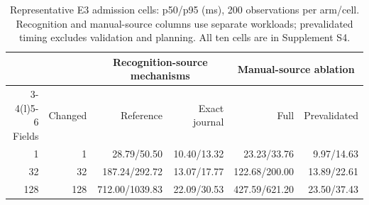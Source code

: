 \begin{table}[tb]
\centering
\footnotesize
\caption{Representative E3 admission cells: p50/p95 (ms), 200 observations per arm/cell. Recognition and manual-source columns use separate workloads; prevalidated timing excludes validation and planning. All ten cells are in Supplement S4.}
\label{tab:dke-admission-selected}
\setlength{\tabcolsep}{3pt}
\begin{tabular}{@{}rr r r r r@{}}
\toprule
 & & \multicolumn{2}{c}{Recognition-source mechanisms} & \multicolumn{2}{c}{Manual-source ablation} \\
\cmidrule(lr){3-4}\cmidrule(l){5-6}
Fields & Changed & Reference & Exact journal & Full & Prevalidated \\
\midrule
1 & 1 & 28.79/50.50 & 10.40/13.32 & 23.23/33.76 & 9.97/14.63 \\
32 & 32 & 187.24/292.72 & 13.07/17.77 & 122.68/200.00 & 13.89/22.61 \\
128 & 128 & 712.00/1039.83 & 22.09/30.53 & 427.59/621.20 & 23.50/37.43 \\
\bottomrule
\end{tabular}
\end{table}

